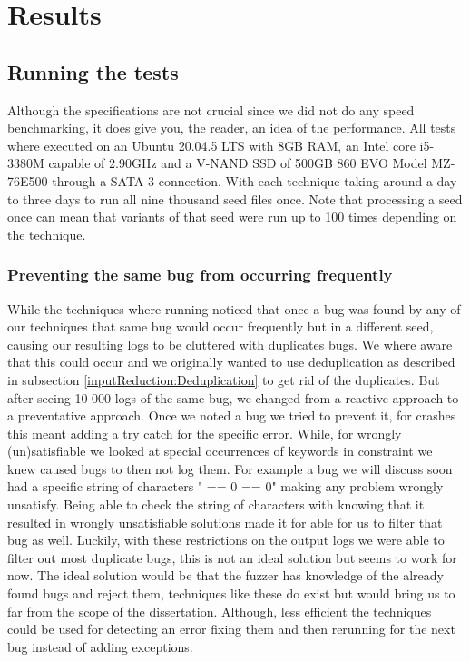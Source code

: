 \chapter{Results}
\label{cha:res}
\label{res:Intro}

\section{Running the tests}
\label{res:RunningTests}
\label{res:Specs}
Although the specifications are not crucial since we did not do any speed benchmarking, it does give you, the reader, an idea of the performance. All tests where executed on an Ubuntu 20.04.5 LTS with 8GB RAM, an Intel core i5-3380M capable of 2.90GHz and a V-NAND SSD of 500GB 860 EVO Model MZ-76E500 through a SATA 3 connection. With each technique taking around a day to three days to run all nine thousand seed files once. Note that processing a seed once can mean that variants of that seed were run up to 100 times depending on the technique.


\subsection{Preventing the same bug from occurring frequently}
While the techniques where running noticed that once a bug was found by any of our techniques that same bug would occur frequently but in a different seed, causing our resulting logs to be cluttered with duplicates bugs. We where aware that this could occur and we originally wanted to use deduplication as described in subsection \ref{inputReduction:Deduplication} to get rid of the duplicates. But after seeing 10 000 logs of the same bug, we changed from a reactive approach to a preventative approach. Once we noted a bug we tried to prevent it, for crashes this meant adding a try catch for the specific error. While, for wrongly (un)satisfiable we looked at special occurrences of keywords in constraint we knew caused bugs to then not log them. For example a bug we will discuss soon had a specific string of characters " == 0 == 0" making any problem wrongly unsatisfy. Being able to check the string of characters with knowing that it resulted in wrongly unsatisfiable  solutions made it for able for us to filter that bug as well. Luckily, with these restrictions on the output logs we were able to filter out most duplicate bugs, this is not an ideal solution but seems to work for now. The ideal solution would be that the fuzzer has knowledge of the already found bugs and reject them, techniques like these do exist but would bring us to far from the scope of the dissertation. Although, less efficient the techniques could be used for detecting an error fixing them and then rerunning for the next bug instead of adding exceptions.


